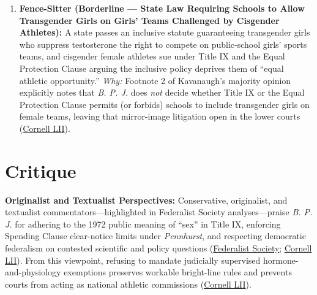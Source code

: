 \documentclass[12pt]{article}
\begin{document}
\begin{enumerate}
\item \textbf{Fence-Sitter (Borderline --- State Law Requiring Schools to Allow Transgender Girls on Girls' Teams Challenged by Cisgender Athletes):} A state passes an inclusive statute guaranteeing transgender girls who suppress testosterone the right to compete on public-school girls' sports teams, and cisgender female athletes sue under Title IX and the Equal Protection Clause arguing the inclusive policy deprives them of ``equal athletic opportunity.'' \emph{Why:} Footnote 2 of Kavanaugh's majority opinion explicitly notes that \textit{B. P. J.} does \emph{not} decide whether Title IX or the Equal Protection Clause permits (or forbids) schools to include transgender girls on female teams, leaving that mirror-image litigation open in the lower courts (\href{https://www.law.cornell.edu/supremecourt/text/24-43}{Cornell LII}).
\end{enumerate}

\section{Critique}

\textbf{Originalist and Textualist Perspectives:} Conservative, originalist, and textualist commentators---highlighted in Federalist Society analyses---praise \textit{B. P. J.} for adhering to the 1972 public meaning of ``sex'' in Title IX, enforcing Spending Clause clear-notice limits under \textit{Pennhurst}, and respecting democratic federalism on contested scientific and policy questions (\href{https://fedsoc.org/case/west-virginia-v-bpj}{Federalist Society}; \href{https://www.law.cornell.edu/supremecourt/text/24-43}{Cornell LII}). From this viewpoint, refusing to mandate judicially supervised hormone-and-physiology exemptions preserves workable bright-line rules and prevents courts from acting as national athletic commissions (\href{https://www.law.cornell.edu/supremecourt/text/24-43}{Cornell LII}).
\end{document}
